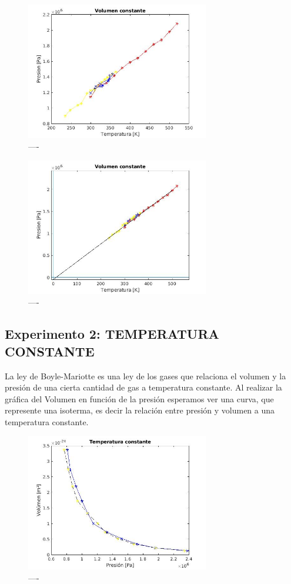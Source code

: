 \documentclass[journal,transmag]{IEEEtran}
\begin{document}
\begin{figure}[!h]
				\center
				\includegraphics[width=8cm]{img/volcte1.jpg}
				\caption{----}
				\label{f13}
	\end{figure}
	\begin{figure}[!h]
				\center
				\includegraphics[width=8cm]{img/volcte2.jpg}
				\caption{----}
				\label{f13}
	\end{figure}


\subsection{Experimento 2: TEMPERATURA CONSTANTE}

La ley de Boyle-Mariotte es una ley de los gases que relaciona el volumen y la presión de una cierta cantidad de gas a temperatura constante. Al realizar la gráfica del Volumen en función de la presión esperamos ver una curva, que represente una isoterma, es decir la relación entre presión y volumen a una temperatura constante.  

\begin{figure}[!h]
				\center
				\includegraphics[width=8cm]{img/temcte.jpg}
				\caption{----}
				\label{f14}
	\end{figure}
\end{document}
